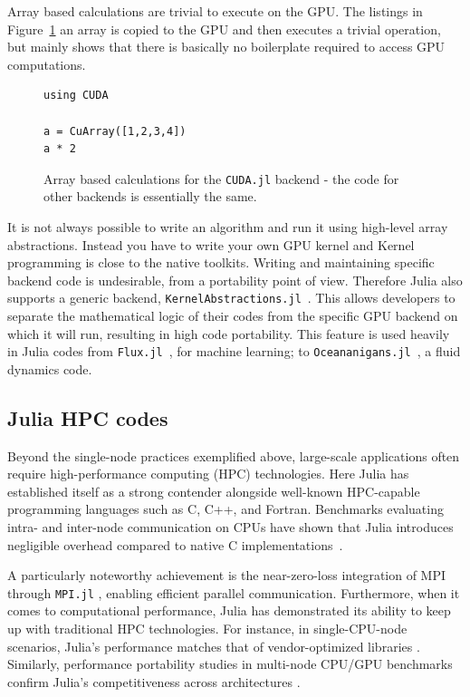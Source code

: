 \documentclass{webofc}
\begin{document}
Array based calculations are trivial to execute on the GPU. The listings in
Figure~\ref{code:arraysgpu} an array is copied to the GPU and then executes a
trivial operation, but mainly shows that there is basically no boilerplate required to access GPU computations. 

\begin{figure}[!ht]
\begin{center}
\begin{verbatim}
using CUDA

a = CuArray([1,2,3,4])
a * 2
\end{verbatim}
\caption{Array based calculations for the \texttt{CUDA.jl} backend - the code for other backends is essentially the same.}
\label{code:arraysgpu}
\end{center}
\end{figure}

It is not always possible to write an algorithm and run it using high-level
array abstractions. Instead you have to write your own GPU kernel and Kernel
programming is close to the native toolkits.  Writing and maintaining specific
backend code is undesirable, from a portability point of view. Therefore Julia
also supports a generic backend,
\texttt{KernelAbstractions.jl}~\cite{BESARD201929,8471188}. This allows
developers to separate the mathematical logic of their codes from the specific
GPU backend on which it will run, resulting in high code portability. This
feature is used heavily in Julia codes from \texttt{Flux.jl}~\cite{innes:2018},
for machine learning; to
\texttt{Oceananigans.jl}~\cite{Ramadhan_Oceananigans_jl_Fast_and_2020}, a fluid
dynamics code.

\subsection{Julia HPC codes}
\label{sec:julia-hpc}
Beyond the single-node practices exemplified above, large-scale applications
often require high-performance computing (HPC) technologies. Here Julia has
established itself as a strong contender alongside well-known HPC-capable
programming languages such as C, C++, and Fortran. Benchmarks evaluating intra-
and inter-node communication on CPUs have shown that Julia introduces negligible
overhead compared to native C implementations~\cite{hunold2020benchmarking}. 

A particularly noteworthy achievement is the near-zero-loss integration of MPI
through \texttt{MPI.jl} \cite{byrne2021mpi}, enabling efficient parallel
communication. Furthermore, when it comes to computational performance, Julia
has demonstrated its ability to keep up with traditional HPC technologies. For
instance, in single-CPU-node scenarios, Julia's performance matches that of
vendor-optimized libraries \cite{giordano2022productivity}. Similarly,
performance portability studies in multi-node CPU/GPU benchmarks confirm Julia's
competitiveness across architectures
\cite{teichgraber2022julia,godoy2023evaluating}.
\end{document}
